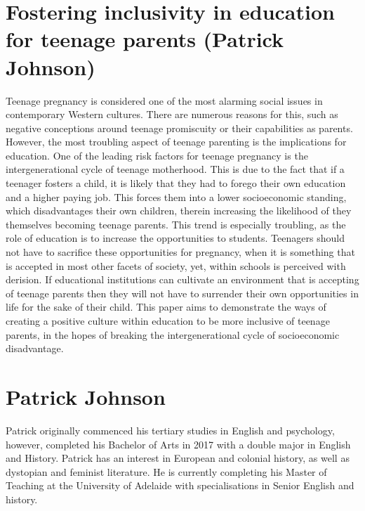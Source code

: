 \documentclass[twoside,14pt,a4paper,notitlepage]{memoir}
\begin{document}
\section*{Fostering inclusivity in education for teenage parents (Patrick Johnson)}
\label{aut:johnson}

Teenage pregnancy is considered one of the most alarming social issues in contemporary Western cultures. There are numerous reasons for this, such as negative conceptions around teenage promiscuity or their capabilities as parents. However, the most troubling aspect of teenage parenting is the implications for education. One of the leading risk factors for teenage pregnancy is the intergenerational cycle of teenage motherhood. This is due to the fact that if a teenager fosters a child, it is likely that they had to forego their own education and a higher paying job. This forces them into a lower socioeconomic standing, which disadvantages their own children, therein increasing the likelihood of they themselves becoming teenage parents. This trend is especially troubling, as the role of education is to increase the opportunities to students. Teenagers should not have to sacrifice these opportunities for pregnancy, when it is something that is accepted in most other facets of society, yet, within schools is perceived with derision. If educational institutions can cultivate an environment that is accepting of teenage parents then they will not have to surrender their own opportunities in life for the sake of their child. This paper aims to demonstrate the ways of creating a positive culture within education to be more inclusive of teenage parents, in the hopes of breaking the intergenerational cycle of socioeconomic disadvantage. 

\section*{Patrick Johnson}

Patrick originally commenced his tertiary studies in English and psychology, however, completed his Bachelor of Arts in 2017 with a double major in English and History. Patrick has an interest in European and colonial history, as well as dystopian and feminist literature. He is currently completing his Master of Teaching at the University of Adelaide with specialisations in Senior English and history.
\end{document}
